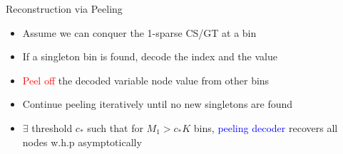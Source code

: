 \documentclass[final]{beamer}
\newlength{\twocolwid}
\newlength{\paraskip}
\begin{document}
\begin{frame}
\begin{columns}[t]
\begin{column}{\twocolwid}
 \begin{block}{\Large Reconstruction via Peeling}
    \begin{itemize}
	   \item Assume we can conquer the 1-sparse CS/GT at a bin
	   \item If a singleton bin is found, decode the index and the value
	   \item \textcolor{red}{Peel off} the decoded variable node value from other bins
   \end{itemize}
    
       \begin{figure}
	       \centering
	       \begin{subfigure}{.5\textwidth}
			  \centering
   			\scalebox{1.1}{}
		   \end{subfigure}%
		  \begin{subfigure}{.5	\textwidth}
		  \centering
		  \scalebox{1.1}{}
			\end{subfigure}	
		\end{figure}
\vspace{\paraskip}	 
	 \begin{itemize}
	   \item Continue peeling iteratively until no new singletons are found
	   \item $\exists$ threshold $c_*$ such that for $M_1>c_*K$ bins, \textcolor{blue}{peeling decoder} recovers all nodes w.h.p asymptotically
    \end{itemize}
    \end{block}  
 \end{column}


\end{columns}
\end{frame}
\end{document}
